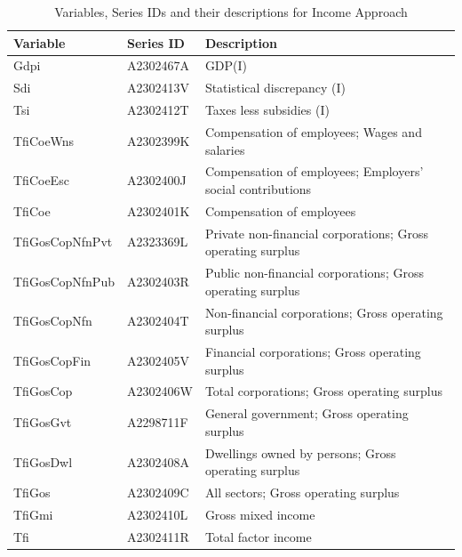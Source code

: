 \documentclass[graybox]{svmult}
\begin{document}
\begin{table}[!h]
	\caption{Variables, Series IDs and their descriptions for Income Approach}
	\small
	\centering
		\begin{tabular*}{\columnwidth}[width = \textwidth]{lll}
			\toprule
			\textbf{Variable} & \textbf{Series ID} & \textbf{Description}\\
			\midrule
			Gdpi & A2302467A & GDP(I)\\
			Sdi & A2302413V & Statistical discrepancy (I)\\
			Tsi & A2302412T & Taxes less subsidies (I)\\
			TfiCoeWns & A2302399K & Compensation of employees; Wages and salaries\\
			TfiCoeEsc & A2302400J & Compensation of employees; Employers' social contributions\\
			\addlinespace
			TfiCoe & A2302401K & Compensation of employees\\
			TfiGosCopNfnPvt & A2323369L & Private non-financial corporations; Gross operating surplus\\
			TfiGosCopNfnPub & A2302403R & Public non-financial corporations; Gross operating surplus\\
			TfiGosCopNfn & A2302404T & Non-financial corporations; Gross operating surplus\\
			TfiGosCopFin & A2302405V & Financial corporations;  Gross operating surplus\\
			\addlinespace
			TfiGosCop & A2302406W & Total corporations; Gross operating surplus\\
			TfiGosGvt & A2298711F & General government; Gross operating surplus\\
			TfiGosDwl & A2302408A & Dwellings owned by persons; Gross operating surplus\\
			TfiGos & A2302409C & All sectors; Gross operating surplus\\
			TfiGmi & A2302410L & Gross mixed income\\
			Tfi & A2302411R & Total factor income\\
			\bottomrule
		\end{tabular*}
		\label{Tab: Income-hierarchy}
	
\end{table}
\end{document}
